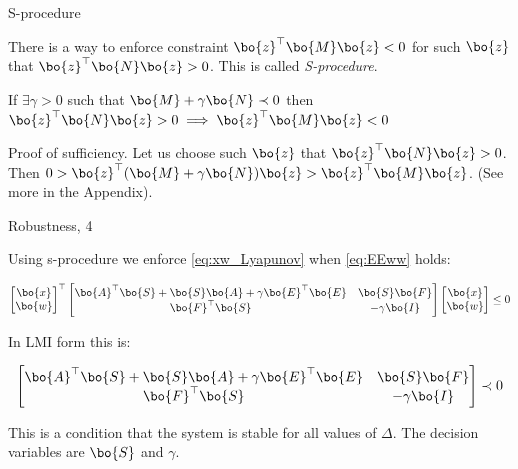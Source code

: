 \documentclass{beamer}
\begin{document}
\begin{frame}{S-procedure}
	\begin{flushleft}
		
		There is a way to enforce constraint $\bo{z}^\top \bo{M}\bo{z} < 0$ for such $\bo{z}$ that $\bo{z}^\top \bo{N}\bo{z} > 0$. This is called \emph{S-procedure}.
		
		\begin{theorem}[S-procedure]
			If $\exists \gamma > 0$ such that $\bo{M} + \gamma \bo{N} \prec 0$ then $\bo{z}^\top \bo{N}\bo{z} > 0 \implies \bo{z}^\top \bo{M}\bo{z} < 0$ 
		\end{theorem}
		
		\bigskip
		
		Proof of sufficiency. Let us choose such $\bo{z}$ that $\bo{z}^\top \bo{N}\bo{z} > 0$. Then $0 > \bo{z}^\top (\bo{M} + \gamma \bo{N}) \bo{z} > \bo{z}^\top \bo{M}\bo{z}$. \textcolor{mygray}{(See more in the Appendix)}.
		
		
	\end{flushleft}
\end{frame}



\begin{frame}{Robustness, 4}
	\begin{flushleft}
		
		
		Using s-procedure we enforce \eqref{eq:xw_Lyapunov} when \eqref{eq:EEww} holds:
		
		\begin{equation}
			\begin{bmatrix}
				\bo{x} \\ \bo{w}
			\end{bmatrix}^\top
			\begin{bmatrix}
				\bo{A}^\top \bo{S} + \bo{S}\bo{A} + \gamma \bo{E}^\top \bo{E} & \bo{S}\bo{F} \\
				\bo{F}^\top\bo{S} & -\gamma\bo{I}
			\end{bmatrix}		
			\begin{bmatrix}
				\bo{x} \\ \bo{w}
			\end{bmatrix}
			\leq 0
		\end{equation}
		
		In LMI form this is:
		
		\begin{equation}
			\begin{bmatrix}
				\bo{A}^\top \bo{S} + \bo{S}\bo{A} + \gamma \bo{E}^\top \bo{E} & \bo{S}\bo{F} \\
				\bo{F}^\top\bo{S} & -\gamma\bo{I}
			\end{bmatrix}		
			\prec 0
		\end{equation}	
		
		
		This is a condition that the system is stable for all values of $\Delta$. The decision variables are $\bo{S}$ and $\gamma$.		
		
	\end{flushleft}
\end{frame}
\end{document}

